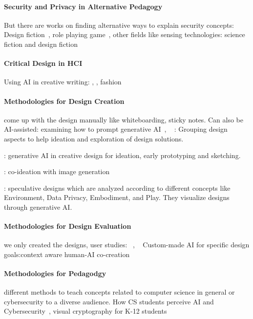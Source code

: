 \paragraph{Security and Privacy in Alternative Pedagogy}

But there are works on finding alternative ways to explain security concepts: Design fiction~\cite{loureiro-koechlin_vision_2022}, role playing game~\cite{merrill_security_2020}, other fields like sensing technologies: science fiction and design fiction~\cite{wong_real-fictional_2017}


\paragraph{Critical Design in HCI}

Using AI in creative writing: \cite{chakrabarty_art_2024}, \cite{kim_authors_2024}, fashion~\cite{davis_fashioning_2024}

\paragraph{Methodologies for Design Creation} come up with the design manually like whiteboarding, sticky notes. 
Can also be AI-assisted: examining how to prompt generative AI~\cite{sanchez_examining_2023}, ~\cite{chang_prompt_2023}
\cite{huang_designnet_2023}: Grouping design aspects to help ideation and exploration of design solutions.

\cite{tholander_design_2023}: generative AI in creative design for ideation, early prototyping and sketching.

\cite{chiou_designing_2023}: co-ideation with image generation

\cite{lin_generative_2023}: speculative designs which are analyzed according to different concepts like  Environment, Data Privacy, Embodiment, and Play. They visualize designs through generative AI.


\paragraph{Methodologies for Design Evaluation} we only created the designs, 
user studies: ~\cite{sanchez_examining_2023}, ~\cite{chang_prompt_2023}
Custom-made AI for specific design goals:context aware human-AI co-creation\cite{fan_contextcam_2024}

\paragraph{Methodologies for Pedagodgy} different methods to teach concepts related to computer science in general or cybersecurity to a diverse audience. How CS students perceive AI and Cybersecurity~\cite{ojha_computing_2023}, visual cryptography for K-12 students~\cite{rayavaram_designing_2023}


